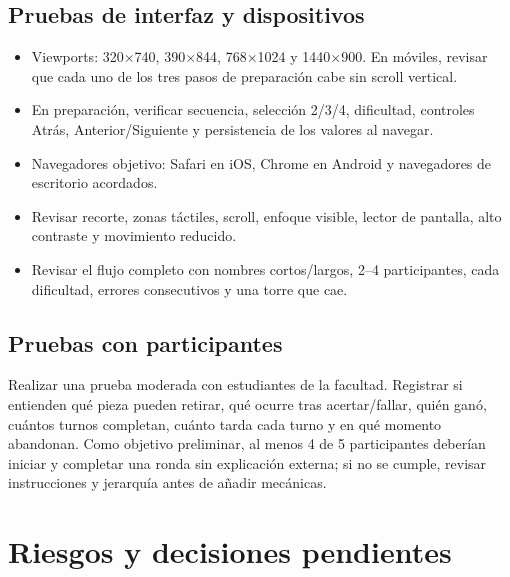 \documentclass[11pt,letterpaper]{article}
\begin{document}
\subsection{Pruebas de interfaz y dispositivos}
\begin{itemize}
  \item Viewports: 320$\times$740, 390$\times$844, 768$\times$1024 y 1440$\times$900. En móviles, revisar que cada uno de los tres pasos de preparación cabe sin scroll vertical.
  \item En preparación, verificar secuencia, selección 2/3/4, dificultad, controles Atrás, Anterior/Siguiente y persistencia de los valores al navegar.
  \item Navegadores objetivo: Safari en iOS, Chrome en Android y navegadores de escritorio acordados.
  \item Revisar recorte, zonas táctiles, scroll, enfoque visible, lector de pantalla, alto contraste y movimiento reducido.
  \item Revisar el flujo completo con nombres cortos/largos, 2--4 participantes, cada dificultad, errores consecutivos y una torre que cae.
\end{itemize}

\subsection{Pruebas con participantes}
Realizar una prueba moderada con estudiantes de la facultad. Registrar si entienden qué pieza pueden retirar, qué ocurre tras acertar/fallar, quién ganó, cuántos turnos completan, cuánto tarda cada turno y en qué momento abandonan. Como objetivo preliminar, al menos 4 de 5 participantes deberían iniciar y completar una ronda sin explicación externa; si no se cumple, revisar instrucciones y jerarquía antes de añadir mecánicas.

\section{Riesgos y decisiones pendientes}
\end{document}
